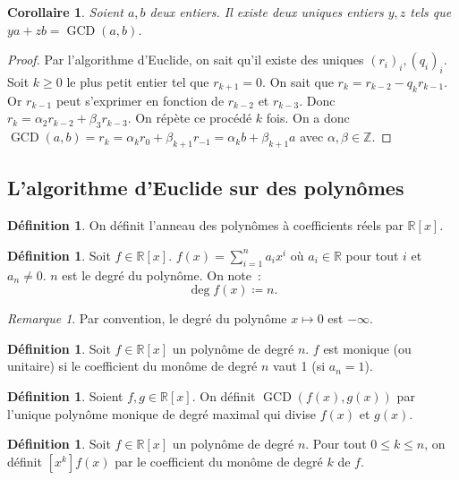 \documentclass{article}
\DeclareMathOperator{\GCD}{GCD}
\newcommand{\Z}{\mathbb Z}
\newcommand{\R}{\mathbb R}
\newtheorem{cor}[thm]{Corollaire}
\theoremstyle{definition}
\newtheorem{déf}[thm]{Définition}
\theoremstyle{remark}
\newtheorem*{rmq}{Remarque}
\begin{document}
		\begin{cor} Soient $a, b$ deux entiers. Il existe deux uniques entiers $y, z$ tels que $ya + zb = \GCD(a, b)$. \end{cor}

		\begin{proof} Par l'algorithme d'Euclide, on sait qu'il existe des uniques $(r_i)_i, (q_i)_i$. Soit $k \geq 0$ le plus petit entier tel que $r_{k+1} = 0$. On sait
		que $r_k = r_{k-2} - q_kr_{k-1}$. Or $r_{k-1}$ peut s'exprimer en fonction de $r_{k-2}$ et $r_{k-3}$. Donc $r_k = \alpha_2r_{k-2}+\beta_3r_{k-3}$.
		On répète ce procédé $k$ fois. On a donc $\GCD(a, b) = r_k = \alpha_kr_0 + \beta_{k+1}r_{-1} = \alpha_kb + \beta_{k+1}a$ avec $\alpha, \beta \in \Z$. \end{proof}
	
	\subsection{L'algorithme d'Euclide sur des polynômes}
		\begin{déf} On définit l'anneau des polynômes à coefficients réels par $\R[x]$. \end{déf}

		\begin{déf} Soit $f \in \R[x]$. $\displaystyle f(x) = \sum_{i=1}^na_ix^i$ où $a_i \in \R$ pour tout $i$ et $a_n \neq 0$. $n$ est le degré du polynôme.
		On note~: \[\deg f(x) \coloneqq n.\] \end{déf}

		\begin{rmq} Par convention, le degré du polynôme $x \mapsto 0$ est $-\infty$. \end{rmq}

		\begin{déf} Soit $f \in \R[x]$ un polynôme de degré $n$. $f$ est monique (ou unitaire) si le coefficient du monôme de degré $n$ vaut 1 (si $a_n = 1$). \end{déf}

		\begin{déf} Soient $f, g \in \R[x]$. On définit $\GCD(f(x), g(x))$ par l'unique polynôme monique de degré maximal qui divise $f(x)$ et $g(x)$. \end{déf}

		\begin{déf} Soit $f \in \R[x]$ un polynôme de degré $n$. Pour tout $0 \leq k \leq n$, on définit $[x^k]f(x)$ par le coefficient du monôme de degré $k$ de $f$.
		\end{déf}
\end{document}
